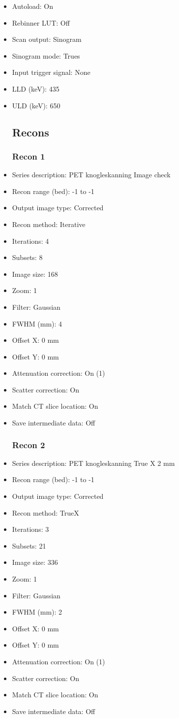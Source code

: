 \documentclass[12pt]{article}
\begin{document}
\begin{itemize}[noitemsep]
\subsection{Scan}
\item Autoload: On
\item Rebinner LUT: Off
\item Scan output: Sinogram
\item Sinogram mode: Trues
\item Input trigger signal: None
\item LLD (keV): 435
\item ULD (keV): 650
\subsection{Recons}
\subsubsection{Recon 1}
\item Series description: PET  knogleskanning  Image check
\item Recon range (bed): -1 to -1
\item Output image type: Corrected
\item Recon method: Iterative
\item Iterations: 4
\item Subsets: 8
\item Image size: 168
\item Zoom: 1
\item Filter: Gaussian
\item FWHM (mm): 4
\item Offset X: 0 mm
\item Offset Y: 0 mm
\item Attenuation correction: On (1)
\item Scatter correction: On
\item Match CT slice location: On
\item Save intermediate data: Off
\subsubsection{Recon 2}
\item Series description: PET knogleskanning  True X 2 mm
\item Recon range (bed): -1 to -1
\item Output image type: Corrected
\item Recon method: TrueX
\item Iterations: 3
\item Subsets: 21
\item Image size: 336
\item Zoom: 1
\item Filter: Gaussian
\item FWHM (mm): 2
\item Offset X: 0 mm
\item Offset Y: 0 mm
\item Attenuation correction: On (1)
\item Scatter correction: On
\item Match CT slice location: On
\item Save intermediate data: Off

\end{itemize}
\end{document}

